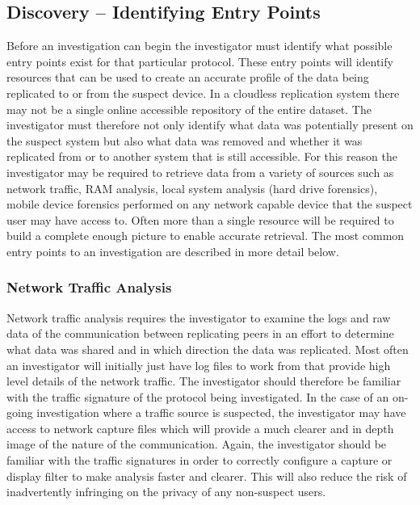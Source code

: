 \documentclass{jdfsl}
\begin{document}
\subsection{Discovery -- Identifying Entry Points}
Before an investigation can begin the investigator must identify what possible entry points exist for that particular protocol. These entry points will identify resources that can be used to create an accurate profile of the data being replicated to or from the suspect device. In a cloudless replication system there may not be a single online accessible repository of the entire dataset. The investigator must therefore not only identify what data was potentially present on the suspect system but also what data was removed and whether it was replicated from or to another system that is still accessible. For this reason the investigator may be required to retrieve data from a variety of sources such as network traffic, RAM analysis, local system analysis (hard drive forensics), mobile device forensics performed on any network capable device that the suspect user may have access to. Often more than a single resource will be required to build a complete enough picture to enable accurate retrieval. The most common entry points to an investigation are described in more detail below.\\

\subsubsection{Network Traffic Analysis}
\label{NDIS}
Network traffic analysis requires the investigator to examine the logs and raw data of the communication between replicating peers in an effort to determine what data was shared and in which direction the data was replicated. Most often an investigator will initially just have log files to work from that provide high level details of the network traffic. The investigator should therefore be familiar with the traffic signature of the protocol being investigated. In the case of an on-going investigation where a traffic source is suspected, the investigator may have access to network capture files which will provide a much clearer and in depth image of the nature of the communication. Again, the investigator should be familiar with the traffic signatures in order to correctly configure a capture or display filter to make analysis faster and clearer. This will also reduce the risk of inadvertently infringing on the privacy of any non-suspect users.
\end{document}
